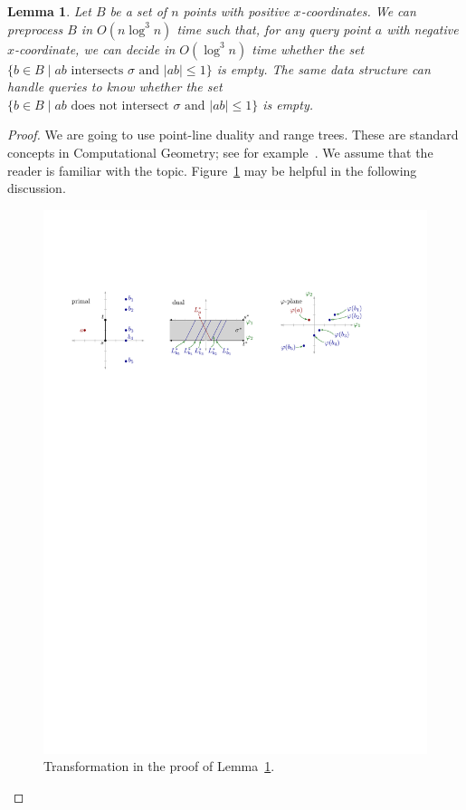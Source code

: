 \documentclass[a4paper,11pt]{article}
\newtheorem{lemma}[theorem]{Lemma}
\let\le\leqslant
\begin{document}
\begin{lemma}
\label{lem:block}
	Let $B$ be a set of $n$ points with positive $x$-coordinates.
	We can preprocess $B$ in $O(n\log^3 n)$ time such that,
	for any query point $a$	with negative $x$-coordinate, 
	we can decide in $O(\log^3 n)$ time whether the set 
	$\{ b\in B \mid \text{$ab$ intersects $\sigma$ and $|ab|\le 1$}\}$
	is empty.
	The same data structure can handle queries
	to know whether the set
	$\{ b\in B \mid \text{$ab$ does not intersect $\sigma$ and $|ab|\le 1$}\}$
	is empty.
\end{lemma}
\begin{proof}
	We are going to use point-line duality and range trees.
	These are standard concepts in Computational Geometry;
	see for example~\cite[Chapters 5 and 8]{bkos-08}.
	We assume that the reader is familiar with the topic.
	Figure~\ref{fig:duality} may be helpful in the following discussion.

	\begin{figure}[htb]
		\centering
		\includegraphics[width=\textwidth]{duality}
		\caption{Transformation in the proof of Lemma~\ref{lem:block}.}
		\label{fig:duality}
	\end{figure}
	

\end{proof}
\end{document}
